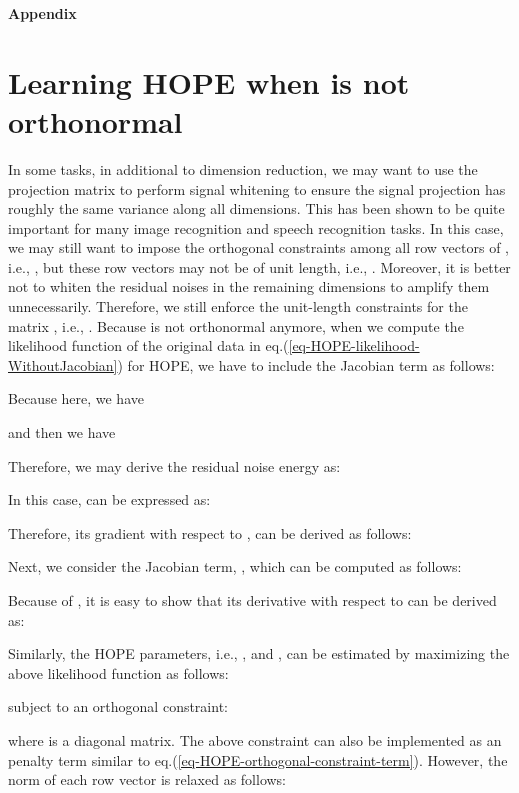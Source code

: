 \documentclass[11pt]{article}
\begin{document}




\newpage 

\begin{center}
\LARGE \bf Appendix
\end{center}

\appendix

\section{Learning HOPE when  is not orthonormal}

\label{appendix-non-orthonormal-U}

In some tasks, in additional to dimension reduction, we may want to use the projection matrix  to perform signal whitening to ensure the signal projection 
 has roughly the same variance along all dimensions. This has been shown to be quite important for many image recognition and speech recognition tasks. In this case, we may still want to impose the orthogonal constraints among all row vectors of , i.e., , but these row vectors may not be of unit length, i.e., . Moreover, it is better not to  whiten the residual noises in the remaining  dimensions to amplify them unnecessarily. Therefore, we still enforce the unit-length constraints for the matrix , i.e., . Because  is not orthonormal anymore, when we compute the likelihood function of the original data in  eq.(\ref{eq-HOPE-likelihood-WithoutJacobian}) for HOPE, we have to include the Jacobian term as follows:



Because  here, we have

and then we have


Therefore, we may derive the residual noise energy as:


In this case,  can be expressed as:


Therefore, its gradient with respect to , can be derived as follows:



Next, we consider the Jacobian term, , which can be computed as follows:


Because of 
, it is easy to show that its derivative with respect to  can be derived as:


Similarly, the HOPE parameters, i.e., ,  and , can be estimated by maximizing the above likelihood function as follows:

subject to an orthogonal constraint: 

where  is a diagonal matrix. The above constraint can also be 
implemented as an penalty term similar to eq.(\ref{eq-HOPE-orthogonal-constraint-term}).
However, the norm of each row vector is relaxed as follows:
\end{document}
